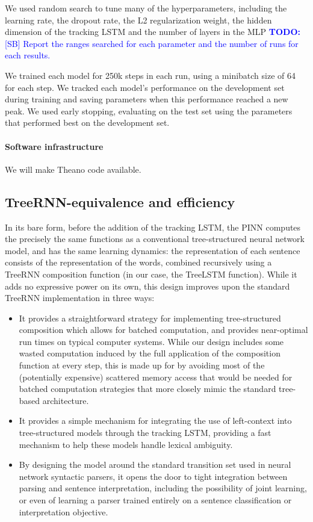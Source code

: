 \documentclass[11pt,letterpaper]{article}
\newcommand\todo[1]{\textcolor{blue}{\textbf{TODO:} #1}}
\begin{document}
We used random search to tune many of the hyperparameters, including the learning rate, the dropout rate, the L2 regularization weight, the hidden dimension of the tracking LSTM and the number of layers in the MLP \todo{[SB] Report the ranges searched for each parameter and the number of runs for each results.}

We trained each model for 250k steps in each run, using a minibatch size of 64 for each step. We tracked each model's performance on the development set during training and saving parameters when this performance reached a new peak. We used early stopping, evaluating on the test set using the parameters that performed best on the development set.

\paragraph{Software infrastructure} We will make Theano code available.

\subsection{TreeRNN-equivalence and efficiency}

In its bare form, before the addition of the tracking LSTM, the PINN computes the precisely the same functions as a conventional tree-structured neural network model, and has the same learning dynamics: the representation of each sentence consists of the representation of the words, combined recursively using a TreeRNN composition function (in our case, the TreeLSTM function). While it adds no expressive power on its own, this design improves upon the standard TreeRNN implementation in three ways:

\begin{itemize}
\item It provides a straightforward strategy for implementing tree-structured composition which allows for batched computation, and provides near-optimal run times on typical computer systems. While our design includes some wasted computation induced by the full application of the composition function at every step, this is made up for by avoiding most of the (potentially expensive) scattered memory access that would be needed for batched computation strategies that more closely mimic the standard tree-based architecture.

\item It provides a simple mechanism for integrating the use of left-context into tree-structured models through the tracking LSTM, providing a fast mechanism to help these models handle lexical ambiguity.

\item By designing the model around the standard transition set used in neural network syntactic parsers, it opens the door to tight integration between parsing and sentence interpretation, including the possibility of joint learning, or even of learning a parser trained entirely on a sentence classification or interpretation objective.
\end{itemize}
\end{document}
